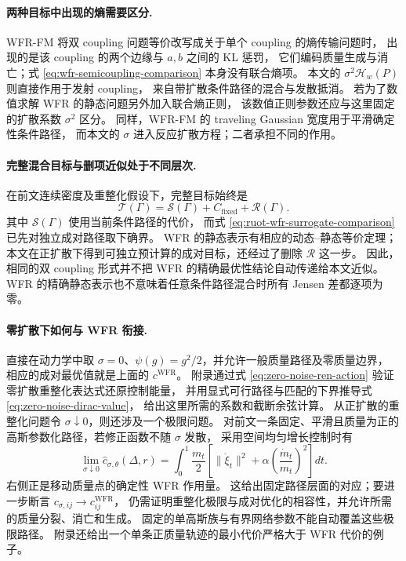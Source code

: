 \documentclass[UTF8,a4paper,11pt,fontset=fandol]{ctexart}
\begin{document}
\paragraph{两种目标中出现的熵需要区分.}
WFR-FM 将双 coupling 问题等价改写成关于单个 coupling 的熵传输问题时，
出现的是该 coupling 的两个边缘与 $a,b$ 之间的 KL 惩罚，
它们编码质量生成与消亡；式 \eqref{eq:wfr-semicoupling-comparison} 本身没有联合熵项。
本文的 $\sigma^2\mathcal H_w(P)$ 则直接作用于发射 coupling，
来自带扩散条件路径的混合与发散抵消。
若为了数值求解 WFR 的静态问题另外加入联合熵正则，
该数值正则参数还应与这里固定的扩散系数 $\sigma^2$ 区分。
同样，WFR-FM 的 traveling Gaussian 宽度用于平滑确定性条件路径，
而本文的 $\sigma$ 进入反应扩散方程；二者承担不同的作用。

\paragraph{完整混合目标与删项近似处于不同层次.}
在前文连续密度及重整化假设下，完整目标始终是
\begin{equation}
\mathcal T(\Gamma)=\mathcal S(\Gamma)+C_{\mathrm{fixed}}+\mathcal R(\Gamma).
\end{equation}
其中 $\mathcal S(\Gamma)$ 使用当前条件路径的代价，
而式 \eqref{eq:ruot-wfr-surrogate-comparison} 已先对独立成对路径取下确界。
WFR 的静态表示有相应的动态--静态等价定理；
本文在正扩散下得到可独立预计算的成对目标，还经过了删除 $\mathcal R$ 这一步。
因此，相同的双 coupling 形式并不把 WFR 的精确最优性结论自动传递给本文近似。
WFR 的精确静态表示也不意味着任意条件路径混合时所有 Jensen 差都逐项为零。

\paragraph{零扩散下如何与 WFR 衔接.}
直接在动力学中取 $\sigma=0$、$\psi(g)=g^2/2$，并允许一般质量路径及零质量边界，
相应的成对最优值就是上面的 $c^{\mathrm{WFR}}$。
附录通过式 \eqref{eq:zero-noise-ren-action} 验证零扩散重整化表达式还原控制能量，
并用显式可行路径与匹配的下界推导式 \eqref{eq:zero-noise-dirac-value}，
给出这里所需的系数和截断余弦计算。
从正扩散的重整化问题令 $\sigma\downarrow0$，则还涉及一个极限问题。
对前文一条固定、平滑且质量为正的高斯参数化路径，若修正函数不随 $\sigma$ 发散，
采用空间均匀增长控制时有
\begin{equation}
\lim_{\sigma\downarrow0}\widehat c_{\sigma,\theta}(\Delta,r)
=\int_0^1\frac{m_t}{2}
\left[\|\dot\xi_t\|^2
+\alpha\left(\frac{\dot m_t}{m_t}\right)^2\right]dt.
\label{eq:fixed-path-wfr-limit}
\end{equation}
右侧正是移动质量点的确定性 WFR 作用量。
这给出固定路径层面的对应；要进一步断言 $c_{\sigma,ij}\to c_{ij}^{\mathrm{WFR}}$，
仍需证明重整化极限与成对优化的相容性，并允许所需的质量分裂、消亡和生成。
固定的单高斯族与有界网络参数不能自动覆盖这些极限路径。
附录还给出一个单条正质量轨迹的最小代价严格大于 WFR 代价的例子。
\end{document}

